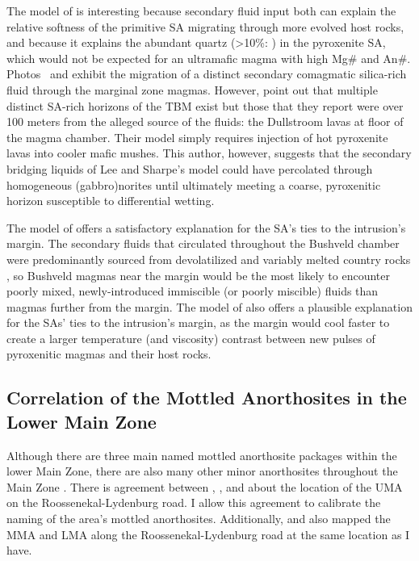The model of \citet{lee1979} is interesting because secondary fluid
input both can explain the relative softness of the primitive SA
migrating through more evolved host rocks, and because it explains the
abundant quartz (\textgreater10\%: \citealp{lee1979}) in the
pyroxenite SA, which would not be expected for an ultramafic magma with
high Mg\# and An\#. Photos~ and  exhibit the migration of a distinct
secondary comagmatic silica-rich fluid through the marginal zone magmas.
However, \citet{mitchell2023} point out that multiple distinct
SA-rich horizons of the TBM exist but those that they report were over
100 meters from the alleged source of the fluids: the Dullstroom lavas
at floor of the magma chamber. Their model simply requires injection of
hot pyroxenite lavas into cooler mafic mushes. This author, however,
suggests that the secondary bridging liquids of Lee and Sharpe's model
could have percolated through homogeneous (gabbro)norites until
ultimately meeting a coarse, pyroxenitic horizon susceptible to
differential wetting.

The model of \citet{lee1979} offers a satisfactory explanation for
the SA's ties to the intrusion's margin. The secondary fluids that
circulated throughout the Bushveld chamber were predominantly sourced
from devolatilized and variably melted country rocks \citep[see also \S\ref{sec:ch5-stable-isotopes-of-the-rls}, ``'']{schiffries1990,buick2000}, so Bushveld magmas near the margin would
be the most likely to encounter poorly mixed, newly-introduced
immiscible (or poorly miscible) fluids than magmas further from the
margin. The model of \citet{mitchell2023} also offers a plausible
explanation for the SAs' ties to the intrusion's margin, as the margin
would cool faster to create a larger temperature (and viscosity)
contrast between new pulses of pyroxenitic magmas and their host rocks.

\subsection{Correlation of the Mottled Anorthosites in the Lower Main Zone}
\label{sec:ch5-correlation-of-the-mottled-anorthosites-in-the-lower-main-zo}

Although there are three main named mottled anorthosite packages within
the lower Main Zone, there are also many other minor anorthosites
throughout the Main Zone \citep{sacs1980,vongruenewaldt1985}.
There is agreement between \citet{vandermerwe2007}, \citet{setera2018},
and \citet{latypovetal2022} about the location of the UMA on the
Roossenekal-Lydenburg road. I allow this agreement to calibrate the
naming of the area's mottled anorthosites. Additionally, \citet{vandermerwe2007}
and \citet{latypovetal2022} also mapped the MMA and LMA along the
Roossenekal-Lydenburg road at the same location as I have.

